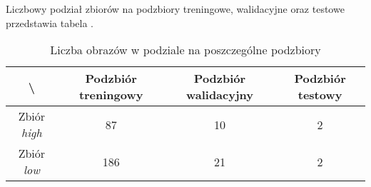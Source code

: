Liczbowy podział zbiorów na podzbiory treningowe, walidacyjne oraz testowe przedstawia tabela .

\begin{table}[!h]
	\centering
	\caption{Liczba obrazów w podziale na poszczególne podzbiory}
	\vspace{6pt}
	{\footnotesize
		\begin{tabular}{|c|c|c|c|}
			\hline \textbackslash & Podzbiór treningowy & Podzbiór walidacyjny & Podzbiór testowy \\
      \hline Zbiór \textit{high} & 87 & 10 & 2 \\
      \hline Zbiór \textit{low} & 186 & 21 & 2 \\
      \hline
    \end{tabular}
    \label{Tab:podzial_summary}
	}
	\vspace{0pt}
\end{table}
